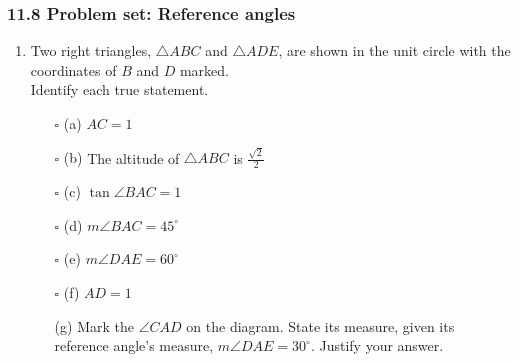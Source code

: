 \documentclass[12pt, twoside]{article}
\begin{document}
\subsubsection*{11.8 Problem set: Reference angles}

\begin{enumerate}

  \item Two right triangles, $\triangle ABC$ and $\triangle ADE$, are shown in the unit circle with the coordinates of $B$ and $D$ marked. \\[0.2cm]
  Identify each true statement. %
  \begin{multicols}{2}
    \begin{enumerate}[itemsep=0.4cm]
      \item[$\square$ (a)] $AC=1$
      \item[$\square$ (b)] The altitude of $\triangle ABC$ is $\displaystyle \frac{\sqrt{2}}{2}$
      \item[$\square$ (c)] $\displaystyle \tan \angle BAC= 1$
      \item[$\square$ (d)] $m\angle BAC = 45^\circ$
      \item[$\square$ (e)] $m\angle DAE = 60^\circ$
      \item[$\square$ (f)] $AD=1$
      \item[(g)] Mark the $\angle CAD$ on the diagram. State its measure, given its reference angle's measure, $m\angle DAE=30^\circ$. Justify your answer.
      \end{enumerate}
    \end{multicols} \vspace{1.5cm}


\end{enumerate}
\end{document}
